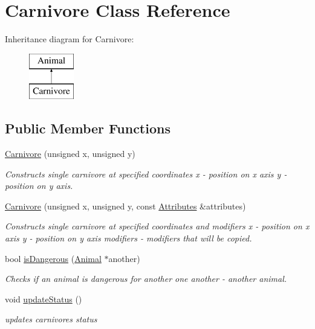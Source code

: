 \hypertarget{class_carnivore}{}\section{Carnivore Class Reference}
\label{class_carnivore}
Inheritance diagram for Carnivore\+:\begin{figure}[H]
\begin{center}
\leavevmode
\includegraphics[height=2.000000cm]{class_carnivore}
\end{center}
\end{figure}
\subsection*{Public Member Functions}
\begin{DoxyCompactItemize}
\item 
\hyperlink{class_carnivore_a8c55205bb6dadd456cebcb0b9b798e3f}{Carnivore} (unsigned x, unsigned y)
\begin{DoxyCompactList}\small\item\em Constructs single carnivore at specified coordinates  x -\/ position on x axis  y -\/ position on y axis. \end{DoxyCompactList}\item 
\hyperlink{class_carnivore_a877b1801c58da376cc0e2119f67492af}{Carnivore} (unsigned x, unsigned y, const \hyperlink{class_attributes}{Attributes} \&attributes)
\begin{DoxyCompactList}\small\item\em Constructs single carnivore at specified coordinates and modifiers  x -\/ position on x axis  y -\/ position on y axis  modifiers -\/ modifiers that will be copied. \end{DoxyCompactList}\item 
bool \hyperlink{class_carnivore_a6119646adbb63f861d7a8f873e03086c}{is\+Dangerous} (\hyperlink{class_animal}{Animal} $\ast$another)
\begin{DoxyCompactList}\small\item\em Checks if an animal is dangerous for another one  another -\/ another animal. \end{DoxyCompactList}\item 
void \hyperlink{class_carnivore_a34c97ab897ebe2454390997fb49e5f90}{update\+Status} ()
\begin{DoxyCompactList}\small\item\em updates carnivore\textquotesingle{}s status \end{DoxyCompactList}\end{DoxyCompactItemize}
